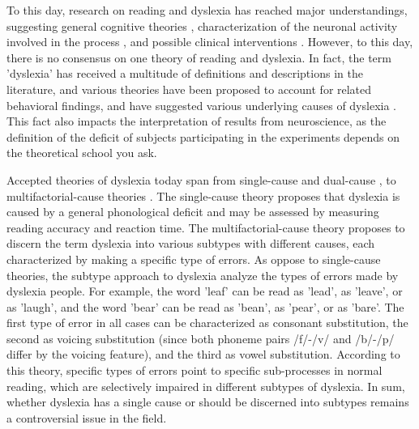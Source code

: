 To this day, research on reading and dyslexia has reached major understandings, suggesting general cognitive theories \cite{stanovich1988explaining, vellutino1995semantic, ramus2003relationship, amitay2003reply, ck12}, characterization of the neuronal activity involved in the process \citep{joubert2004neural, gaab2007neural, dehaene2010children}, and possible clinical interventions \citep{coltheart1989treatment, aylward2003instructional, kipp2008remediation}. However, to this day, there is no consensus on one theory of reading and dyslexia. In fact, the term 'dyslexia' has received a multitude of definitions and descriptions in the literature, and various theories have been proposed to account for related behavioral findings, and have suggested various underlying causes of dyslexia \citep{eg14}. This fact also impacts the interpretation of results from neuroscience, as the definition of the deficit of subjects participating in the experiments depends on the theoretical school you ask. 

Accepted theories of dyslexia today span from single-cause \citep{stanovich1988explaining, s98, s00} and dual-cause \citep{wolf1999double}, to multifactorial-cause theories \citep{ck12}. The single-cause theory proposes that dyslexia is caused by a general phonological deficit and may be assessed by measuring reading accuracy and reaction time. The multifactorial-cause theory proposes to discern the term dyslexia into various subtypes with different causes, each characterized by making a specific type of errors. As oppose to single-cause theories, the subtype approach to dyslexia analyze the types of errors made by dyslexia people. For example, the word 'leaf' can be read as 'lead', as 'leave', or as 'laugh', and the word 'bear' can be read as 'bean', as 'pear', or as 'bare'. The first type of error in all cases can be characterized as consonant substitution, the second as voicing substitution (since both phoneme pairs /f/-/v/ and /b/-/p/ differ by the voicing feature), and the third as vowel substitution. According to this theory, specific types of errors point to specific sub-processes in normal reading, which are selectively impaired in different subtypes of dyslexia. In sum, whether dyslexia has a single cause or should be discerned into subtypes remains a controversial issue in the field.

